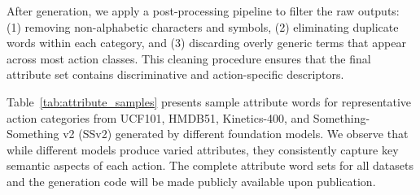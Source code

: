\documentclass[runningheads]{llncs}
\begin{document}
After generation, we apply a post-processing pipeline to filter the raw outputs: (1) removing non-alphabetic characters and symbols, (2) eliminating duplicate words within each category, and (3) discarding overly generic terms that appear across most action classes. This cleaning procedure ensures that the final attribute set contains discriminative and action-specific descriptors.

Table~\ref{tab:attribute_samples} presents sample attribute words for representative action categories from UCF101, HMDB51, Kinetics-400, and Something-Something v2 (SSv2) generated by different foundation models. We observe that while different models produce varied attributes, they consistently capture key semantic aspects of each action. The complete attribute word sets for all datasets and the generation code will be made publicly available upon publication.
\end{document}
